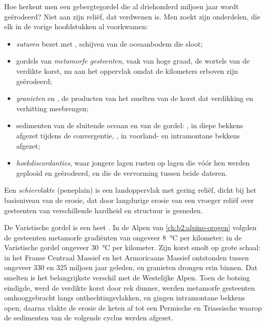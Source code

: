 Hoe herkent men een gebergtegordel die al driehonderd miljoen jaar wordt geërodeerd?
Niet aan zijn reliëf, dat verdwenen is. Men zoekt zijn onderdelen, die elk in de vorige
hoofdstukken al voorkwamen:
\begin{itemize}
\item \emph{suturen} bezet met \emph{}, schijven van de oceaanbodem die sloot;
\item gordels van \emph{metamorfe gesteenten}, vaak van hoge graad, de wortels van de verdikte korst,
nu aan het oppervlak omdat de kilometers erboven zijn geërodeerd;
\item \emph{granieten} en \emph{}, de producten van het smelten van de korst dat
verdikking en verhitting meebrengen;
\item sedimenten van de sluitende oceaan en van de gordel: \emph{}, in diepe bekkens afgezet
tijdens de convergentie, \emph{}, in voorland- en intramontane bekkens afgezet;
\item \emph{hoekdiscordanties}, waar jongere lagen rusten op lagen die vóór hen werden geplooid en
geërodeerd, en die de vervorming tussen beide dateren.
\end{itemize}

\begin{definition}[Schiervlakte]\label{def:b2:wilson-cycle:peneplain}
Een \emph{schiervlakte} (peneplain) is een landoppervlak met gering reliëf, dicht bij het basisniveau van
de erosie, dat door langdurige erosie van een vroeger reliëf over gesteenten van verschillende hardheid en
structuur is gesneden.
\end{definition}

De Varistische gordel is een heet . In de Alpen van \cref{ch:b2:alpine-orogen} volgden de gesteenten
metamorfe gradiënten van ongeveer \qty{8}{\celsius} per kilometer; in de Varistische gordel
ongeveer \qty{30}{\celsius} per kilometer. Zijn korst smolt op grote schaal: in het Franse Centraal Massief
en het Armoricaans Massief ontstonden  tussen ongeveer 330 en 325 miljoen jaar geleden, en
granieten drongen erin binnen. Dat smelten is het belangrijkste verschil met de Westelijke Alpen. Toen de
botsing eindigde, werd de verdikte korst door rek dunner, werden metamorfe gesteenten omhooggebracht
langs onthechtingsvlakken, en gingen intramontane bekkens open; daarna vlakte de erosie de keten af tot een
Permische en Triassische  waarop de sedimenten van de volgende cyclus werden afgezet.

